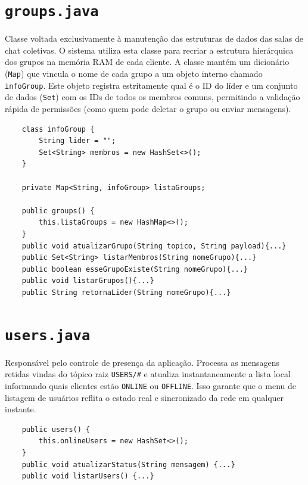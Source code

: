 \documentclass{report}
\begin{document}
\section{\texttt{groups.java}}
Classe voltada exclusivamente à manutenção das estruturas de dados das salas de chat coletivas. O sistema utiliza esta classe para recriar a estrutura hierárquica dos grupos na memória RAM de cada cliente. A classe mantém um dicionário (\texttt{Map}) que vincula o nome de cada grupo a um objeto interno chamado \texttt{infoGroup}. Este objeto registra estritamente qual é o ID do líder e um conjunto de dados (\texttt{Set}) com os IDs de todos os membros comuns, permitindo a validação rápida de permissões (como quem pode deletar o grupo ou enviar mensagens).

\begin{verbatim}
	class infoGroup { 
		String lider = "";
		Set<String> membros = new HashSet<>();
	}

	private Map<String, infoGroup> listaGroups;

	public groups() {
		this.listaGroups = new HashMap<>();
	}
	public void atualizarGrupo(String topico, String payload){...}
	public Set<String> listarMembros(String nomeGrupo){...}
	public boolean esseGrupoExiste(String nomeGrupo){...}
	public void listarGrupos(){...}
	public String retornaLider(String nomeGrupo){...}
\end{verbatim}
\section{\texttt{users.java}}
Responsável pelo controle de presença da aplicação. Processa as mensagens retidas vindas do tópico raiz \texttt{USERS/\#} e atualiza instantaneamente a lista local informando quais clientes estão \texttt{ONLINE} ou \texttt{OFFLINE}. Isso garante que o menu de listagem de usuários reflita o estado real e sincronizado da rede em qualquer instante.
\begin{verbatim}
	public users() {
		this.onlineUsers = new HashSet<>();
	}
	public void atualizarStatus(String mensagem) {...}
	public void listarUsers() {...}
\end{verbatim}
\end{document}
